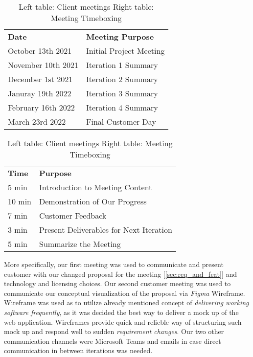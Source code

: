 \documentclass{l3proj}
\begin{document}
        
        \begin{table}[H]
        \begin{tabular}{ll}
        \textbf{Date}               & \textbf{Meeting Purpose}         \\
        October 13th 2021  & Initial Project Meeting \\
        November 10th 2021 & Iteration 1 Summary     \\
        December 1st 2021  & Iteration 2 Summary     \\
        Januray 19th 2022  & Iteration 3 Summary     \\
        February 16th 2022 & Iteration 4 Summary     \\
        March 23rd 2022    & Final Customer Day   
        \end{tabular}
        \quad
        \begin{tabular}{ll}
        \textbf{Time}   & \textbf{Purpose}                                 \\
        5  min  & Introduction to Meeting Content         \\
        10 min & Demonstration of Our Progress           \\
        7  min  & Customer Feedback                       \\
        3  min  & Present Deliverables for Next Iteration \\
        5  min  & Summarize the Meeting                  
        \end{tabular}
        \caption{Left table: Client meetings    Right table: Meeting Timeboxing}
        \end{table}
        
        \newline
        \newline
        More specifically, our first meeting was used to communicate and present customer with our changed proposal for the meeting [\ref{sec:req_and_feat}] and technology and licensing choices. Our second customer meeting was used to communicate our conceptual visualization of the proposal via \textit{Figma} Wireframe. Wireframe was used as to utilize already mentioned concept of \textit{delivering working software frequently}\cite{manifesto}, as it was decided the best way to deliver a mock up of the web application. Wireframes provide quick and relieble way of structuring such mock up and respond well to sudden \textit{requirement changes}\cite{manifesto}\cite{wireframe}.
        \newline
        Our two other communication channels were Microsoft Teams and emails in case direct communication in between iterations was needed.
        
\end{document}

